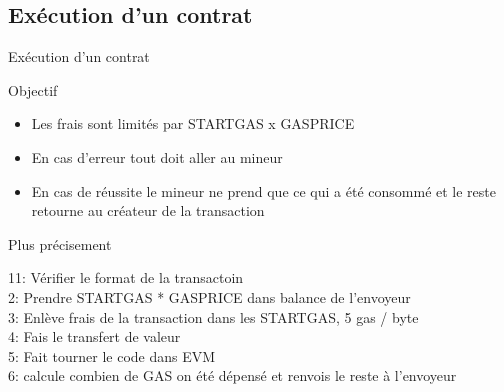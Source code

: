 \documentclass[presentation]{beamer}
\begin{document}
\subsection{Exécution d'un contrat}
\label{sec:orgb45a422}
\begin{frame}[label={sec:org90b16cd}]{Exécution d'un contrat}
\begin{block}{Objectif}
\begin{itemize}
\item Les frais sont limités par STARTGAS x GASPRICE
\item En cas d'erreur tout doit aller au mineur
\item En cas de réussite le mineur ne prend que ce qui a été consommé et le reste retourne au créateur de la transaction
\end{itemize}
\end{block}

\begin{block}{Plus précisement}
\begin{verbatiminput}
11: Vérifier le format de la transactoin\\
2: Prendre STARTGAS * GASPRICE dans balance de l'envoyeur\\
3: Enlève frais de la transaction dans les STARTGAS, 5 gas / byte\\
4: Fais le transfert de valeur\\
5: Fait tourner le code dans EVM\\
6: calcule combien de GAS on été dépensé et renvois le reste à l'envoyeur\\
\end{verbatiminput}
\end{block}
\end{frame}
\end{document}
